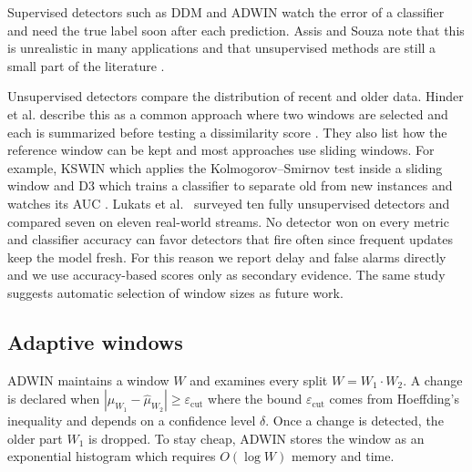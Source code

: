 \documentclass[conference]{IEEEtran}
\begin{document}
Supervised detectors such as DDM \cite{gama2004} and ADWIN \cite{bifet2007} watch the error of a classifier and need the true label soon after each prediction. Assis and Souza note that this is unrealistic in many applications and that unsupervised methods are still a small part of the literature \cite{assis2025}.

Unsupervised detectors compare the distribution of recent and older data. Hinder et al. describe this as a common approach where two windows are selected and each is summarized before testing a dissimilarity score \cite{hinder2024a}. They also list how the reference window can be kept and most approaches use sliding windows. For example, KSWIN which applies the Kolmogorov--Smirnov test inside a sliding window \cite{raab2020} and D3 which trains a classifier to separate old from new instances and watches its AUC \cite{gozuacik2019}. Lukats et al.\ \cite{lukats2025} surveyed ten fully unsupervised detectors and compared seven on eleven real-world streams. No detector won on every metric and classifier accuracy can favor detectors that fire often since frequent updates keep the model fresh. For this reason we report delay and false alarms directly and we use accuracy-based scores only as secondary evidence. The same study suggests automatic selection of window sizes as future work.

\subsection{Adaptive windows}

ADWIN \cite{bifet2007} maintains a window $W$ and examines every split $W=W_1\cdot W_2$. A change is declared when $|\hat\mu_{W_1}-\hat\mu_{W_2}|\ge\varepsilon_{\mathrm{cut}}$ where the bound $\varepsilon_{\mathrm{cut}}$ comes from Hoeffding's inequality \cite{hoeffding1963} and depends on a confidence level $\delta$. Once a change is detected, the older part $W_1$ is dropped. To stay cheap, ADWIN stores the window as an exponential histogram \cite{datar2002} which requires $O(\log W)$ memory and time.
\end{document}
